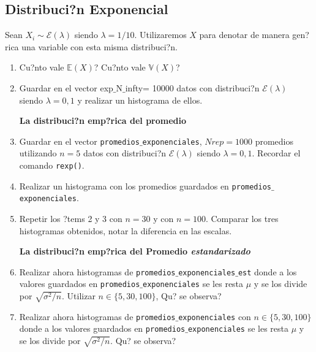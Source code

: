 \documentclass[12pt]{article}
\begin{document}
\subsection{Distribuci?n Exponencial}
Sean $X_i\sim \mathcal E(\lambda)$ siendo $\lambda=1/10$. Utilizaremos $X$ para denotar de manera gen?rica una variable con esta misma distribuci?n.  


\begin{enumerate}	
	\item \textquestiondown Cu?nto vale $\mathbb E(X)$?
	\textquestiondown Cu?nto vale $\mathbb{V}(X)$?
	
		\item Guardar en el vector exp$\_$N$\_$infty= 10000 datos con distribuci?n $\mathcal E(\lambda)$ siendo $\lambda=0,1$ y realizar un histograma de ellos. 

	
	\vspace{0.2cm}	
	\textbf{La distribuci?n emp?rica del promedio}
	
	\item Guardar en el  vector \texttt{promedios$\_$exponenciales}, $Nrep=1000$ promedios utilizando $n=5$ datos con distribuci?n $\mathcal E(\lambda)$ siendo $\lambda=0,1$. Recordar el comando \texttt{rexp()}.
	\item Realizar un histograma con los promedios guardados en \texttt{promedios$\_$exponenciales}.
	\item Repetir los ?tems 2 y 3 con $n=30$ y con $n=100$. Comparar los tres histogramas obtenidos, notar la diferencia en las escalas.
	
	\vspace{0.2cm}
	\textbf{La distribuci?n emp?rica  del Promedio \textit{estandarizado}}
	
	
	\item  Realizar ahora histogramas de \texttt{promedios$\_$exponenciales$\_$est} donde a los valores guardados en \texttt{promedios$\_$exponenciales} se les resta $\mu$ y se los divide por $\sqrt{\sigma^2/n}$. Utilizar  $n \in \{5,30,100\}$, \textquestiondown Qu? se observa?
	
	
	
	\item  Realizar ahora histogramas de \texttt{promedios$\_$exponenciales} con $n \in \{5,30,100\}$ donde a los valores guardados en \texttt{promedios$\_$exponenciales} se les resta $\mu$ y se los divide por $\sqrt{\sigma^2/n}$. \textquestiondown Qu? se observa?
	
\end{enumerate}
\end{document}

